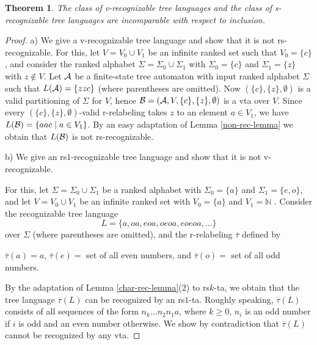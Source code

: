 \documentclass[10pt]{scrartcl}
\newtheorem{theo}[df]{Theorem}
\newcommand{\A}{{\cal A}}
\newcommand{\B}{{\cal B}}
\begin{document}
\begin{theo} \label{var-vs-sym-theo}The class of v-recognizable tree languages and the class of s-recognizable tree languages are incomparable with respect to inclusion.
\end{theo}
\begin{proof}

a) We give a v-recognizable tree language and show that it is not rs-recognizable. For this, let $V=V_0 \cup V_1$ be an infinite ranked set such that $V_0 =\{c\}$, and consider the ranked alphabet $\Sigma= \Sigma_0 \cup \Sigma_1$ with $\Sigma_0 = \{c\}$ and $\Sigma_1 = \{z\}$ with $z\not\in V$.
Let $\A$ be a finite-state tree automaton
with input ranked alphabet $\Sigma$ such that $L(\A)=\{zzc\}$ (where parentheses are omitted). Now $(\{c\},\{z\},\emptyset)$ is a valid partitioning of $\Sigma$ for $V$, hence $\B=(\A,V,\{c\},\{z\},\emptyset)$ is a vta over $V$. Since every $(\{c\},\{z\},\emptyset)$-valid r-relabeling takes $z$ to an element $a\in V_1$, we have   $L(\B)=\{aac \mid a\in V_1\}$. By an easy adaptation of Lemma \ref{non-rec-lemma} we obtain that $L(\B)$ is not rs-recognizable.

b) We give an rs$1$-recognizable tree language and show that it
is not v-recognizable. 

For this, let $\Sigma = \Sigma_0 \cup \Sigma_1$ be a ranked alphabet with $\Sigma_0 = \{a\}$ and $\Sigma_1 = \{e, o\}$, and let 
$V = V_0 \cup V_1$ be an infinite ranked set with $V_0 = \{ a \}$ and $V_1 = \mathbb{N}$ .
Consider the recognizable tree language $$L= \{ a, oa, eoa, oeoa, eoeoa, \ldots\}$$ over $\Sigma$ (where parentheses are omitted),
and the r-relabeling $\overline{\tau}$ defined by

$\overline{\tau}(a) = a$, $\overline{\tau}(e)=$ set of all even numbers, and $\overline{\tau}(o)=$ set of all odd
numbers.

By the adaptation of Lemma \ref{char-rec-lemma}(2) to rs$k$-ta, we obtain that the tree language
$\overline{\tau}(L)$ can be recognized by an rs$1$-ta. Roughly speaking, $\overline{\tau}(L)$ consists of all sequences of the form $n_k\ldots n_2n_1a$, where $k\geq 0$, $n_i$ is an odd number if $i$ is odd and an even number otherwise.
We show by contradiction that $\overline{\tau}(L)$ cannot be recognized by any vta.


\end{proof}
\end{document}
